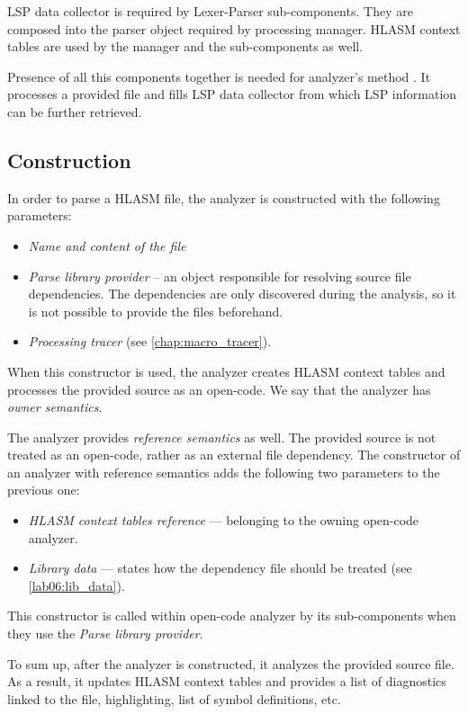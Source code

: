 LSP data collector is required by Lexer-Parser sub-components. They are composed into the parser object required by processing manager. HLASM context tables are used by the manager and the sub-components as well. 

Presence of all this components together is needed for analyzer's method . It processes a provided file and fills LSP data collector from which LSP information can be further retrieved.  

\subsection{Construction}

In order to parse a HLASM file, the analyzer is constructed with the following parameters:
\begin{itemize}
	\item \emph{Name and content of the file}
	\item \emph{Parse library provider} -- an object responsible for resolving source file dependencies. The dependencies are only discovered during the analysis, so it is not possible to provide the files beforehand.
	\item \emph{Processing tracer} (see \cref{chap:macro_tracer}).
\end{itemize}

When this constructor is used, the analyzer creates HLASM context tables and processes the provided source as an open-code. We say that the analyzer has \emph{owner semantics}. 
 
The analyzer provides \emph{reference semantics} as well. The provided source is not treated as an open-code, rather as an external file dependency. The constructor of an analyzer with reference semantics adds the following two parameters to the previous one:
\begin{itemize}
	\item \emph{HLASM context tables reference} --- belonging to the owning open-code analyzer.
	\item \emph{Library data} --- states how the dependency file should be treated (see \cref{lab06:lib_data}).
\end{itemize}

This constructor is called within open-code analyzer by its sub-components when they use the \emph{Parse library provider}.

\vspace{0.5cm}

To sum up, after the analyzer is constructed, it analyzes the provided source file. As a result, it updates HLASM context tables and provides a list of diagnostics linked to the file, highlighting, list of symbol definitions, etc.

